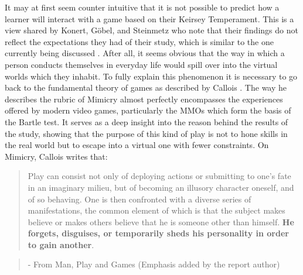\documentclass[12pt,a4paper,twoside]{report}
\begin{document}
It may at first seem counter intuitive that it is not possible to predict how a learner will interact with a game based on their Keirsey Temperament. This is a view shared by Konert, G{\"o}bel, and Steinmetz who note that their findings do not reflect the expectations they had of their study, which is similar to the one currently being discussed \cite{konertmodeling}. After all, it seems obvious that the way in which a person conducts themselves in everyday life would spill over into the virtual worlds which they inhabit. To fully explain this phenomenon it is necessary to go back to the fundamental theory of games as described by Callois \cite{caillois1961man}. The way he describes the rubric of Mimicry almost perfectly encompasses the experiences offered by modern video games, particularly the MMOs which form the basis of the Bartle test. It serves as a deep insight into the reason behind the results of the study, showing that the purpose of this kind of play is not to hone skills in the real world but to escape into a virtual one with fewer constraints. On Mimicry, Callois writes that:

\begin{quotation}
	Play can consist not only of deploying actions or submitting to one's fate in an imaginary milieu, but of becoming an illusory character oneself, and of so behaving. One is then confronted with a diverse series of manifestations, the common element of which is that the subject makes believe or makes others believe that he is someone other than himself. \textbf{He forgets, disguises, or temporarily sheds his personality in order to gain another}.
\end{quotation}
\begin{quote}
	- From Man, Play and Games \cite{caillois1961man} (Emphasis added by the report author)
\end{quote}
\end{document}
